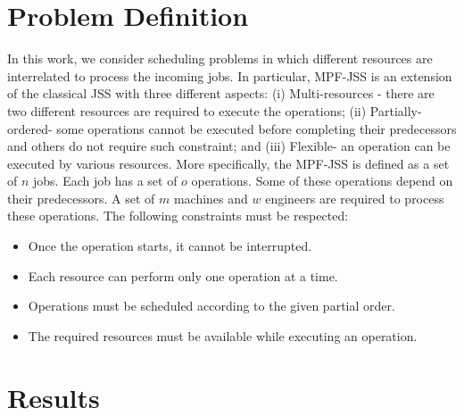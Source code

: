 \documentclass[submission,copyright,creativecommons]{eptcs}
\begin{document}
\section{Problem Definition}
In this work, we consider scheduling problems in which different resources are interrelated to process the incoming jobs. In particular, MPF-JSS is an extension of the classical JSS with three different aspects: (i) Multi-resources - there are two different resources are required to execute the operations; (ii) Partially-ordered- some operations cannot be executed before completing their predecessors and others do not require such constraint; and (iii) Flexible- an operation can be executed by various resources. More specifically, the MPF-JSS is defined as a set of $n$ jobs. Each job has a set of $o$ operations. Some of these operations depend on their predecessors. A set of $m$ machines and $w$ engineers are required to process these operations. The following constraints must be respected:
\begin{itemize}
  \item Once the operation starts, it cannot be interrupted.
  \item Each resource can perform only one operation at a time.
  \item Operations must be scheduled according to the given partial order.
  \item The required resources must be available while executing an operation.
\end{itemize}

\section{Results}




\nocite{*}


\end{document}
